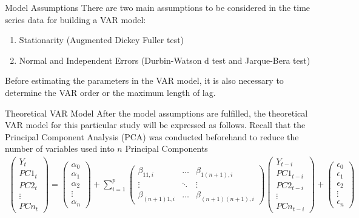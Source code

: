 \documentclass[aspectratio=169]{beamer}
\begin{document}
\begin{frame}{Model Assumptions}
There are two main assumptions to be considered in the time series data for building a VAR
model:
\begin{enumerate}
    \item Stationarity (Augmented Dickey Fuller test)
    \item Normal and Independent Errors (Durbin-Watson d test and Jarque-Bera test)
\end{enumerate}
Before estimating the parameters in the VAR model, it is also necessary to determine the VAR order or the maximum
length of lag.
\end{frame}

\begin{frame}{Theoretical VAR Model}
After the model assumptions are fulfilled, the theoretical VAR model for this particular study will be expressed as follows. Recall that the Principal Component Analysis (PCA) was conducted beforehand to reduce the number of variables used into $n$ Principal Components
    \begin{gather}
            \begin{pmatrix} Y_{t}  \\ PC1_{t} \\ PC2_{t} \\ \vdots \\ PCn_{t} \end{pmatrix}
            =
            \begin{pmatrix} \alpha_{0}  \\ \alpha_{1} \\ \alpha_{2} \\ \vdots \\ \alpha_{n} \end{pmatrix}
            +
            \sum_{i=1}^{p}
            \begin{pmatrix} \beta_{11,i} & \hdots & \beta_{1(n+1),i} \\
            \vdots & \ddots & \vdots\\
            \beta_{(n+1)1,i} & \hdots & \beta_{(n+1)(n+1),i} \end{pmatrix}
            \begin{pmatrix} Y_{t-i}  \\ PC1_{t-i} \\ PC2_{t-i} \\ \vdots \\ PCn_{t-i} \end{pmatrix}
            +
            \begin{pmatrix} \epsilon_{0}  \\ \epsilon_{1} \\ \epsilon_{2} \\ \vdots \\ \epsilon_{n} \end{pmatrix}
    \end{gather}
\end{frame}
\end{document}

